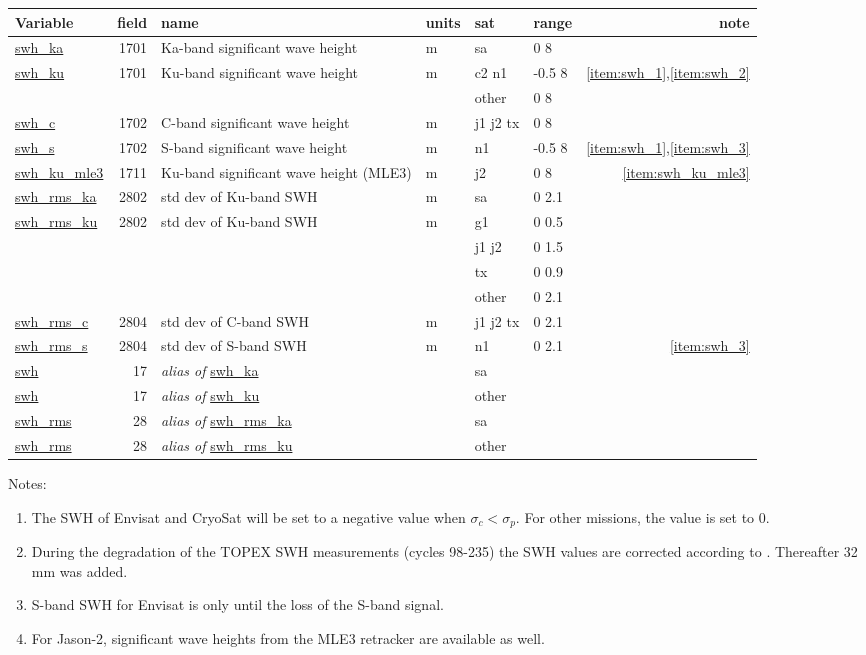 \documentclass[a4paper,11pt,openany,natbib]{thesis}
\makeatletter
\newcommand\var[1]{\url{#1}\index{variables!#1@\protect\url{#1}}}
\newcommand\alias[1]{\emph{alias of} \var{#1}}
\newenvironment{vartable}{
\begin{table}[ht]
\small
\begin{tabular}{lrllllr}
\hline
Variable & field & name & units & sat & range & note \\
\hline
}{
\hline
\end{tabular}
\end{table}
}
\makeatother
\begin{document}
\begin{vartable}
\var{swh_ka} & 1701 & Ka-band significant wave height & m & sa & 0 8 & \\
\var{swh_ku} & 1701 & Ku-band significant wave height & m & c2 n1 & -0.5 8 & \ref{item:swh_1},\ref{item:swh_2} \\
& & & & other & 0 8 & \\
\var{swh_c} & 1702 & C-band significant wave height & m & j1 j2 tx & 0 8 & \\
\var{swh_s} & 1702 & S-band significant wave height & m & n1 & -0.5 8 & \ref{item:swh_1},\ref{item:swh_3} \\
\var{swh_ku_mle3} & 1711 & Ku-band significant wave height (MLE3) & m & j2 & 0 8 & \ref{item:swh_ku_mle3} \\
\hline
\var{swh_rms_ka} & 2802 & std dev of Ku-band SWH & m & sa & 0 2.1 & \\
\var{swh_rms_ku} & 2802 & std dev of Ku-band SWH & m & g1 & 0 0.5 & \\
& & & & j1 j2 & 0 1.5 & \\
& & & & tx & 0 0.9 & \\
& & & & other & 0 2.1 & \\
\var{swh_rms_c} & 2804 & std dev of C-band SWH & m & j1 j2 tx & 0 2.1 & \\
\var{swh_rms_s} & 2804 & std dev of S-band SWH & m & n1 & 0 2.1 & \ref{item:swh_3} \\
\hline
\var{swh} & 17 & \alias{swh_ka} && sa && \\
\var{swh} & 17 & \alias{swh_ku} && other && \\
\hline
\var{swh_rms} & 28 & \alias{swh_rms_ka} && sa && \\
\var{swh_rms} & 28 & \alias{swh_rms_ku} && other && \\
\end{vartable}

Notes:
\begin{enumerate}
\item The SWH of Envisat and CryoSat will be set to a negative value when $\sigma_c<\sigma_p$. For other missions, the value is set to 0.\label{item:swh_1}
\item During the degradation of the TOPEX SWH measurements (cycles 98-235) the SWH values are corrected according to \citet{queffeulou2004}. Thereafter 32 mm was added.\label{item:swh_2}
\item S-band SWH for Envisat is only until the loss of the S-band signal.\label{item:swh_3}
\item For Jason-2, significant wave heights from the MLE3 retracker are available as well.\label{item:swh_ku_mle3}
\end{enumerate}
\end{document}
